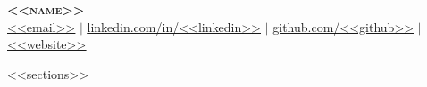 \documentclass[letterpaper,11pt]{article}
\begin{document}
\begin{center}
    \textbf{\Huge \scshape <<name>>} \\ \vspace{1pt}
    \href{mailto:<<email>>}{\underline{<<email>>}} $|$
    \href{https://linkedin.com/in/<<linkedin>>}{\underline{linkedin.com/in/<<linkedin>>}} $|$
    \href{https://github.com/<<github>>}{\underline{github.com/<<github>>}} $|$
    \href{https://<<website>>}{\underline{<<website>>}}
\end{center}




<<sections>>

\end{document}

